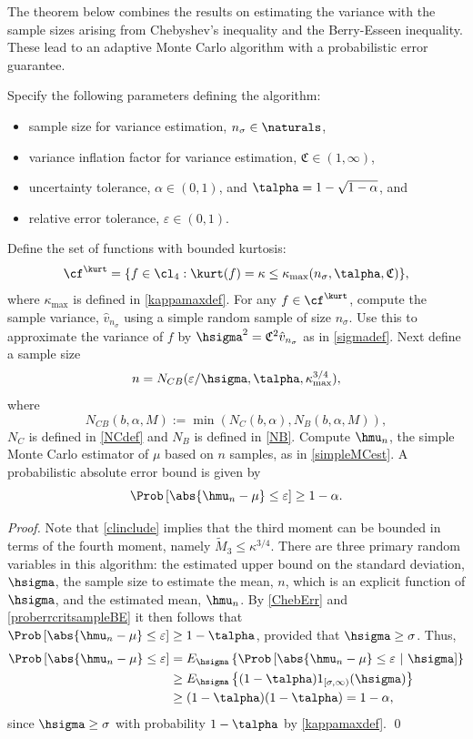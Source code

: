 \documentclass[graybox]{svmult}
\newcommand{\hv}{\hat{v}}
\newcommand{\fudge}{\mathfrak{C}}
\begin{document}
The theorem below combines the results on estimating the variance with the sample sizes arising from Chebyshev's inequality and the Berry-Esseen inequality.  These lead to an adaptive Monte Carlo algorithm with a probabilistic error guarantee.

\begin{theorem} \label{mainadaptthm} Specify the following parameters defining the algorithm:
\begin{itemize}
\item sample size for variance estimation, $n_{\sigma} \in \naturals$,
\item variance inflation factor for variance estimation, $\fudge \in (1,\infty)$,
\item uncertainty tolerance, $\alpha\in (0,1)$, and $\talpha = 1 - \sqrt{1 - \alpha}$, and
\item relative error tolerance, $\varepsilon \in (0,1)$. 
\end{itemize} 
Define the set of functions with bounded kurtosis:
\[
\cf^{\kurt}= \{f \in \cl_{4} : \kurt(f)= \kappa \le \kappa_{\max}(n_{\sigma},\talpha,\fudge) \},
\]
where $\kappa_{\max}$ is defined in \eqref{kappamaxdef}.  For any $f \in \cf^{\kurt}$, compute the sample variance, $\hv_{n_{\sigma}}$ using a simple random sample of size $n_{\sigma}$. Use this to approximate the variance of $f$ by $\hsigma^2 = \fudge^2 \hv_{n_{\sigma}}$ as in \eqref{sigmadef}.  Next define a sample size
\[
n = N_{CB}(\varepsilon/\hsigma,\talpha,\kappa_{\max}^{3/4}),
\]
where
\begin{equation} \label{NCBdef}
N_{CB}(b,\alpha,M) := \min\left( N_C(b,\alpha), N_B(b,\alpha,M) \right),
\end{equation} 
$N_C$ is defined in \eqref{NCdef} and  $N_B$ is defined in \eqref{NB}.  Compute $\hmu_n$, the simple Monte Carlo estimator of $\mu$ based on $n$ samples, as in \eqref{simpleMCest}.  A probabilistic absolute error bound is given by
\[
\Prob\left[\abs{\hmu_n-\mu} \le \varepsilon \right] \geq 1-\alpha.
\]
\end{theorem}
\begin{proof} Note that \eqref{clinclude} implies that the third moment can be bounded in terms of the fourth moment, namely $\widetilde{M}_3 \le \kappa^{3/4}$. There are three primary random variables in this algorithm:  the estimated upper bound on the standard deviation, $\hsigma$, the sample size to estimate the mean, $n$, which is an explicit function of $\hsigma$, and the estimated mean, $\hmu_n$. By  \eqref{ChebErr} and \eqref{proberrcritsampleBE} it then follows that  $\Prob\left[\abs{\hmu_n-\mu} \le \varepsilon \right] \geq 1-\talpha$, provided that $\hsigma  \ge \sigma$. Thus, 
\begin{align*}
\Prob\left[\abs{\hmu_n-\mu} \le \varepsilon \right] &
= E_{\hsigma} \left\{\Prob\left[\abs{\hmu_n-\mu} \le \varepsilon \ | \ \hsigma \right] \right\} \\
& \ge E_{\hsigma} \left\{(1-\talpha) 1_{[\sigma,\infty)}(\hsigma) \right\}\\
& \ge (1-\talpha) (1-\talpha) = 1-\alpha,
\end{align*}
since $\hsigma \ge \sigma$ with probability $1-\talpha$ by \eqref{kappamaxdef}.  \qed
\end{proof}
\end{document}
